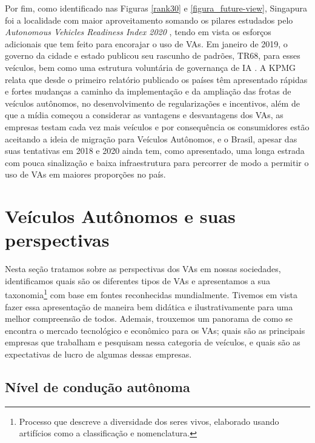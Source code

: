 Por fim, como identificado nas Figuras \ref{rank30} e \ref{figura_future-view}, Singapura foi a localidade com maior aproveitamento somando os pilares estudados pelo \textit{Autonomous Vehicles Readiness Index 2020} \cite{KPMG}, tendo em vista os esforços adicionais que tem feito para encorajar o uso de VAs. Em janeiro de 2019, o governo da cidade e estado publicou seu rascunho de padrões, TR68, para esses veículos, bem como uma estrutura voluntária de governança de IA \cite{KPMG}. A KPMG relata que desde o primeiro relatório publicado os países têm apresentado rápidas e fortes mudanças a caminho da implementação e da ampliação das frotas de veículos autônomos, no desenvolvimento de regularizações e incentivos, além de que a mídia começou a considerar as vantagens e desvantagens dos VAs, as empresas testam cada vez mais veículos e por consequência os consumidores estão aceitando a ideia de migração para Veículos Autônomos, e o Brasil, apesar das suas tentativas em 2018 e 2020 ainda tem, como apresentado, uma longa estrada com pouca sinalização e baixa infraestrutura para percorrer de modo a permitir o uso de VAs em maiores proporções no país.

\newpage
\section{Veículos Autônomos e suas perspectivas}

Nesta seção tratamos sobre as perspectivas dos VAs em nossas sociedades, identificamos quais são os diferentes tipos de VAs e apresentamos a sua taxonomia\footnote{Processo que descreve a diversidade dos seres vivos, elaborado usando artifícios como a classificação e nomenclatura.} com base em fontes reconhecidas mundialmente. Tivemos em vista fazer essa apresentação de maneira bem didática e ilustrativamente para uma melhor compreensão de todos. Ademais, trouxemos um panorama de como se encontra o mercado tecnológico e econômico para os VAs; quais são as principais empresas que trabalham e pesquisam nessa categoria de veículos, e quais são as expectativas de lucro de algumas dessas empresas.

\subsection{Nível de condução autônoma}  \label{nv3}
	
